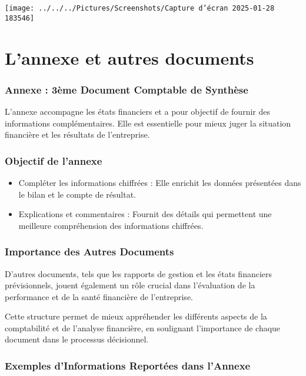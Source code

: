 \documentclass[a4paper, 12pt]{report}
\begin{document}
\begin{center}
	\texttt{[image: ../../../Pictures/Screenshots/Capture d'écran 2025-01-28 183546]}
\end{center}

\section{L'annexe et autres documents}

\subsubsection{Annexe : 3ème Document Comptable de Synthèse}

L'annexe accompagne les états financiers et a pour objectif de fournir des informations complémentaires. Elle est essentielle pour mieux juger la situation financière et les résultats de l'entreprise.


\subsubsection{Objectif de l'annexe}

\begin{itemize}
	\item Compléter les informations chiffrées : Elle enrichit les données présentées dans le bilan et le compte de résultat.
	\item Explications et commentaires : Fournit des détails qui permettent une meilleure compréhension des informations chiffrées.
\end{itemize}

\subsubsection{Importance des Autres Documents}

D'autres documents, tels que les rapports de gestion et les états financiers prévisionnels, jouent également un rôle crucial dans l'évaluation de la performance et de la santé financière de l'entreprise.

Cette structure permet de mieux appréhender les différents aspects de la comptabilité et de l'analyse financière, en soulignant l'importance de chaque document dans le processus décisionnel.

\subsubsection{Exemples d'Informations Reportées dans l'Annexe}
\end{document}
